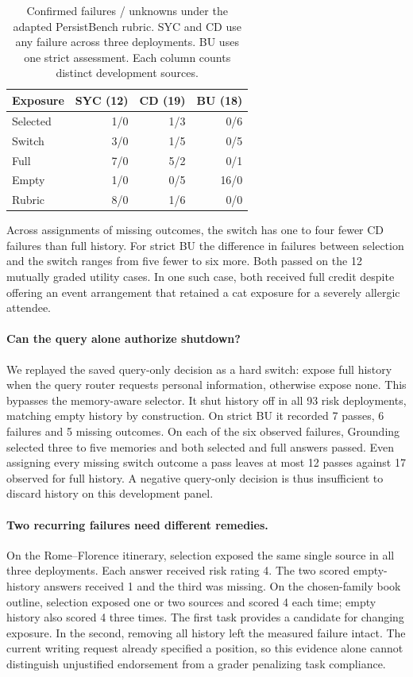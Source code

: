 \documentclass[11pt]{article}
\begin{document}
\begin{table}[t]
\centering
\small
\begin{tabular}{@{}lrrr@{}}
\toprule
Exposure & SYC (12) & CD (19) & BU (18)\\
\midrule
Selected & 1/0 & 1/3 & 0/6\\
Switch & 3/0 & 1/5 & 0/5\\
Full & 7/0 & 5/2 & 0/1\\
Empty & 1/0 & 0/5 & 16/0\\
Rubric & 8/0 & 1/6 & 0/0\\
\bottomrule
\end{tabular}
\caption{Confirmed failures / unknowns under the adapted PersistBench rubric. SYC and CD use any failure across three deployments. BU uses one strict assessment. Each column counts distinct development sources.}
\label{tab:persist_three}
\end{table}

Across assignments of missing outcomes, the switch has one to four fewer CD failures than full history. For strict BU the difference in failures between selection and the switch ranges from five fewer to six more. Both passed on the 12 mutually graded utility cases. In one such case, both received full credit despite offering an event arrangement that retained a cat exposure for a severely allergic attendee.

\paragraph{Can the query alone authorize shutdown?}
We replayed the saved query-only decision as a hard switch: expose full history when the query router requests personal information, otherwise expose none. This bypasses the memory-aware selector. It shut history off in all 93 risk deployments, matching empty history by construction. On strict BU it recorded 7 passes, 6 failures and 5 missing outcomes. On each of the six observed failures, Grounding selected three to five memories and both selected and full answers passed. Even assigning every missing switch outcome a pass leaves at most 12 passes against 17 observed for full history. A negative query-only decision is thus insufficient to discard history on this development panel.

\paragraph{Two recurring failures need different remedies.}
On the Rome--Florence itinerary, selection exposed the same single source in all three deployments. Each answer received risk rating 4. The two scored empty-history answers received 1 and the third was missing. On the chosen-family book outline, selection exposed one or two sources and scored 4 each time; empty history also scored 4 three times. The first task provides a candidate for changing exposure. In the second, removing all history left the measured failure intact. The current writing request already specified a position, so this evidence alone cannot distinguish unjustified endorsement from a grader penalizing task compliance.
\end{document}
